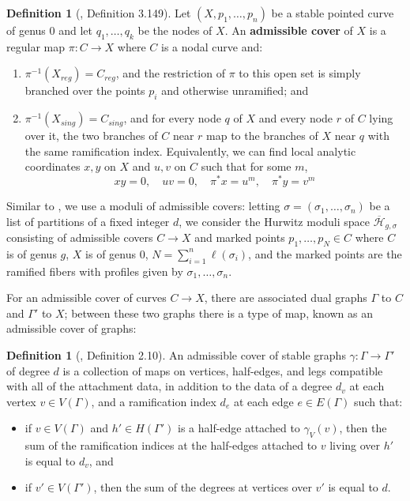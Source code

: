 \documentclass[11pt]{article}           %
\newcommand{\Hb}{\overline{\mathcal H}}
\theoremstyle{definition}
\newtheorem{dfn}[thm]{Definition}
\begin{document}
\begin{dfn}[\cite{Moduli}, Definition 3.149]
  Let $(X,p_1,\dots,p_n)$ be a stable pointed curve of genus $0$
  and let $q_1,\dots,q_k$ be the nodes of $X$.
  An {\bf admissible cover} of $X$ is a regular map $\pi:C\to X$ where $C$ is
  a nodal curve and:
  \begin{enumerate}
  \item $\pi^{-1}(X_{reg})=C_{reg}$, and the restriction of $\pi$ to
    this open set is simply branched over the points $p_i$ and otherwise
    unramified; and
  \item $\pi^{-1}(X_{sing})=C_{sing}$, and for every node $q$ of $X$ and
    every node $r$ of $C$ lying over it, the two branches of $C$ near
    $r$ map to the branches of $X$ near $q$ with the same ramification index.
    Equivalently, we can find local analytic coordinates $x,y$ on $X$ and $u,v$ on $C$ such that for some $m$,
    \[
    xy=0,\quad uv=0,\quad \pi^*x=u^m,\quad \pi^*y=v^m
    \]
    \end{enumerate}

  \end{dfn}

Similar to \cite{Generalized}, we use
a moduli of admissible covers: letting
$\sigma=(\sigma_1,\dots,\sigma_n)$ be a list of
partitions of a fixed integer $d$, we consider the
Hurwitz moduli space $\Hb_{g,\sigma}$ consisting of admissible covers
$C\to X$ and marked points $p_1,\dots,p_N\in C$ where $C$ is
of genus $g$, $X$ is of genus $0$,
$N=\sum_{i=1}^n\ell(\sigma_i)$, and the marked points
are the ramified fibers with profiles given by $\sigma_1,\dots,\sigma_n$.

For an admissible cover of curves $C\to X$, there are associated dual
graphs $\Gamma$ to $C$ and $\Gamma'$ to $X$; between these two graphs
there is a type of map, known as an admissible cover of graphs:

\begin{dfn}[\cite{Lian}, Definition 2.10]
  An admissible cover of stable graphs $\gamma:\Gamma\to\Gamma'$
  of degree $d$ is a collection of maps on vertices, half-edges, and
  legs compatible with all of the attachment
  data, in addition to the data of a degree
  $d_v$ at each vertex $v\in V(\Gamma)$,
  and a ramification index $d_e$ at each
  edge $e\in E(\Gamma)$ such that:
  \begin{itemize}
  \item if $v\in V(\Gamma)$ and $h'\in H(\Gamma')$
    is a half-edge attached to $\gamma_V(v)$, then
    the sum of the ramification indices
    at the half-edges attached to $v$ living
    over $h'$ is equal to $d_v$, and
  \item
    if $v'\in V(\Gamma')$, then the sum
    of the degrees at vertices over $v'$ is
    equal to $d$.
    \end{itemize}
\end{dfn}
\end{document}
